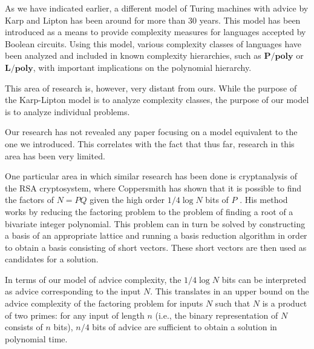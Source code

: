 As we have indicated earlier, a different model of Turing machines with
advice by Karp and Lipton has been around for more than 30 years. This
model has been introduced as a means to provide complexity measures for
languages accepted by Boolean circuits. Using this model, various
complexity classes of languages have been analyzed and included in known
complexity hierarchies, such as $\mathbf{P/poly}$ or $\mathbf{L/poly}$,
with important implications on the polynomial hierarchy.

This area of research is, however, very distant from ours. While the
purpose of the Karp-Lipton model is to analyze complexity classes, the
purpose of our model is to analyze individual problems.

Our research has not revealed any paper focusing on a model equivalent to
the one we introduced. This correlates with the fact that thus far,
research in this area has been very limited.

One particular area in which similar research has been done is
cryptanalysis of the RSA cryptosystem, where Coppersmith has shown that it
is possible to find the factors of $N = PQ$ given the high order $1/4 \log
N$ bits of $P$ \cite{factoring}. His method works by reducing the
factoring problem to the problem of finding a root of a bivariate integer
polynomial. This problem can in turn be solved by constructing a basis of
an appropriate lattice and running a basis reduction algorithm in order to
obtain a basis consisting of short vectors. These short vectors are then
used as candidates for a solution.

In terms of our model of advice complexity, the $1/4 \log N$ bits can be
interpreted as advice corresponding to the input $N$. This translates in
an upper bound on the advice complexity of the factoring problem for
inputs $N$ such that $N$ is a product of two primes: for any input of
length $n$ (i.e., the binary representation of $N$ consists of $n$ bits),
$n/4$ bits of advice are sufficient to obtain a solution in polynomial
time.

